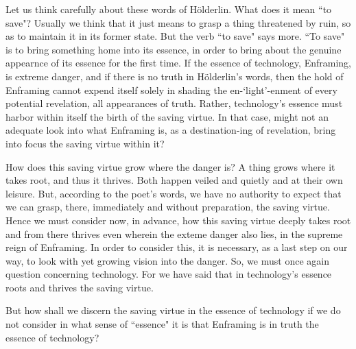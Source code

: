 \documentclass[paper=a4, fontsize=11pt,twoside]{scrartcl}
\begin{document}
Let us think carefully about these words of H{\"o}lderlin. What does it mean ``to save"? Usually we think that it just means to grasp a thing threatened by ruin, so as to maintain it in its former state. But the verb ``to save" says more. ``To save" is to bring something home into its essence, in order to bring about the genuine appearnce of its essence for the first time. If the essence of technology, Enframing, is extreme danger, and if there is no truth in H{\"o}lderlin's words, then the hold of Enframing cannot expend itself solely in shading the en-`light'-enment of every potential revelation, all appearances of truth. Rather, technology's essence must harbor within itself the birth of the saving virtue. In that case, might not an adequate look into what Enframing is, as a destination-ing of revelation, bring into focus the saving virtue within it? 

How does this saving virtue grow where the danger is?  A thing grows where it takes root, and thus it thrives. Both happen veiled and quietly and at their own leisure.  But, according to the poet's words, we have no authority to expect that we can grasp, there, immediately and without preparation, the saving virtue. Hence we must consider now, in advance, how this saving virtue deeply takes root and from there thrives even wherein the exteme danger also lies, in the supreme reign of Enframing. In order to consider this, it is necessary, as a last step on our way, to look with yet growing vision into the danger. So, we must once again question concerning technology. For we have said that in technology's essence roots and thrives the saving virtue.

But how shall we discern the saving virtue in the essence of technology if we do not consider in what sense of ``essence" it is that Enframing is in truth the essence of technology?
\end{document}
